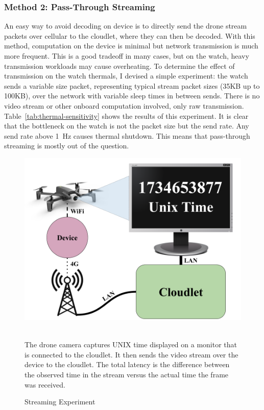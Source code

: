\subsubsection{Method 2: Pass-Through Streaming}
\label{sec:method-2}
An easy way to avoid decoding on device is to directly send the drone stream packets over cellular to the cloudlet, where they can then be decoded. With this method, computation on the device is minimal but network transmission is much more frequent. This is a good tradeoff in many cases, but on the watch, heavy transmission workloads may cause overheating. To determine the effect of transmission on the watch thermals, I devised a simple experiment: the watch sends a variable size packet, representing typical stream packet sizes (35KB up to 100KB), over the network with variable sleep times in between sends. There is no video stream or other onboard computation involved, only raw transmission. Table~\ref{tab:thermal-sensitivity} shows the results of this experiment. It is clear that the bottleneck on the watch is not the packet size but the send rate. Any send rate above 1~Hz causes thermal shutdown. This means that pass-through streaming is mostly out of the question.

\begin{figure}
    \centering
    \includegraphics[width=0.75\linewidth]{chapter3/FIGS/mtp-experiment.png}
    \begin{captext}
    \\ \small The drone camera captures UNIX time displayed on a monitor that is connected to the cloudlet. It then sends the video stream over the device to the cloudlet. The total latency is the difference between the observed time in the stream versus the actual time the frame was received.
    \end{captext}
    \caption{Streaming Experiment}
    \label{fig:streaming-experiment}
\end{figure}

